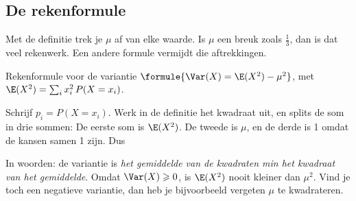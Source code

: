 \begin{oefeningen}
\end{oefeningen}

\subsection{De rekenformule}

Met de definitie trek je $\mu$ af van elke waarde. Is $\mu$ een breuk zoals $\frac13$, dan is dat veel rekenwerk. Een andere formule vermijdt die aftrekkingen.

\begin{theorie}
\begin{stelling}{Rekenformule voor de variantie}
\qquad $\formule{\Var(X) = \E(X^2) - \mu^2}$, \quad met $\E(X^2) = \sum_i x_i^2 \, P(X = x_i)$.
\end{stelling}

\begin{bewijs}
Schrijf $p_i = P(X = x_i)$. Werk in de definitie het kwadraat uit, en splits de som in drie sommen:
De eerste som is $\E(X^2)$. De tweede is $\mu$, en de derde is 1 omdat de kansen samen 1 zijn. Dus
\end{bewijs}
\end{theorie}

In woorden: de variantie is \textit{het gemiddelde van de kwadraten min het kwadraat van het gemiddelde}. Omdat $\Var(X) \geqslant 0$, is $\E(X^2)$ nooit kleiner dan $\mu^2$. Vind je toch een negatieve variantie, dan heb je bijvoorbeeld vergeten $\mu$ te kwadrateren.


